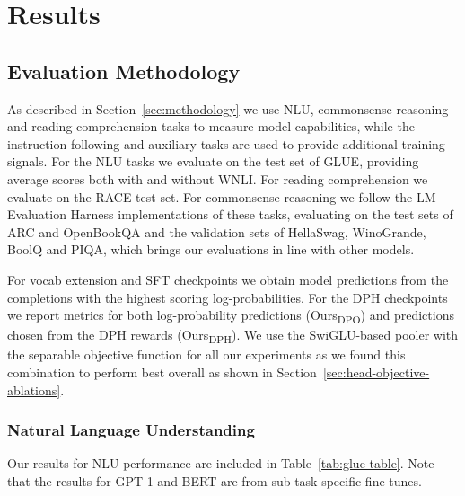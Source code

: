 \section{Results}
\subsection{Evaluation Methodology}
As described in Section~\ref{sec:methodology} we use NLU, commonsense reasoning and reading comprehension tasks to measure model capabilities, while the instruction following and auxiliary tasks are used to provide additional training signals. For the NLU tasks we evaluate on the test set of GLUE, providing average scores both with and without WNLI. For reading comprehension we evaluate on the RACE test set. For commonsense reasoning we follow the LM Evaluation Harness \cite{eval-harness} implementations of these tasks, evaluating on the test sets of ARC and OpenBookQA and the validation sets of HellaSwag, WinoGrande, BoolQ and PIQA, which brings our evaluations in line with other models.

For vocab extension and SFT checkpoints we obtain model predictions from the completions with the highest scoring log-probabilities. For the DPH checkpoints we report metrics for both log-probability predictions (Ours\textsubscript{DPO}) and predictions chosen from the DPH rewards (Ours\textsubscript{DPH}). We use the SwiGLU-based pooler with the separable objective function for all our experiments as we found this combination to perform best overall as shown in Section~\ref{sec:head-objective-ablations}.


\subsubsection{Natural Language Understanding}
Our results for NLU performance are included in Table~\ref{tab:glue-table}. Note that the results for GPT-1 \cite{Radford2018ImprovingLU} and BERT \cite{devlin2019bert} are from sub-task specific fine-tunes.

